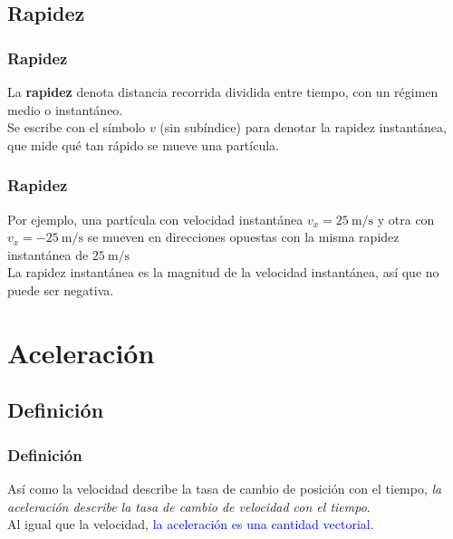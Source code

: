 \subsection*{Rapidez}
\begin{frame}
\frametitle{Rapidez}
La \textbf{rapidez} denota distancia recorrida dividida entre tiempo, con un régimen medio o instantáneo.
\\
\bigskip
\pause
Se escribe con el símbolo $v$ (sin subíndice) para denotar la rapidez instantánea, que mide qué tan rápido se mueve una partícula.
\end{frame}
\begin{frame}
\frametitle{Rapidez}
Por ejemplo, una partícula con velocidad instantánea $v_{x} = \SI[per-mode=symbol]{25}{\meter\per\second}$ y
otra con $v_{x} = -\SI[per-mode=symbol]{25}{\meter\per\second}$ se mueven en direcciones opuestas con la misma rapidez instantánea de $\SI[per-mode=symbol]{25}{\meter\per\second}$
\\
\bigskip
\pause
La rapidez instantánea es la magnitud de la velocidad instantánea, así que no puede ser negativa.
\end{frame}
\section{Aceleración}
\subsection{Definición}
\begin{frame}
\frametitle{Definición}
Así como la velocidad describe la tasa de cambio de posición con el tiempo, \emph{la aceleración describe la tasa de cambio de velocidad con el tiempo}.
\\
\bigskip
\pause
Al igual que la velocidad, \textcolor{blue}{la aceleración es una cantidad vectorial}.
\end{frame}
